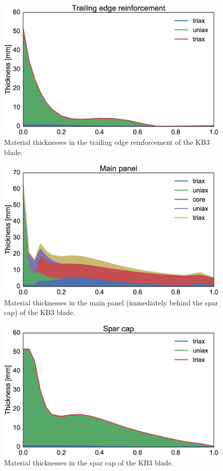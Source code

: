 \begin{figure}[!ht]
\begin{center}
	\includegraphics[width=.85\linewidth]{figures/KB3_region01.eps}
\end{center}
\caption{Material thicknesses in the trailing edge reinforcement of the KB3 blade.}
\label{fig:matstackr01}
\end{figure}

\begin{figure}[!ht]
\begin{center}
	\includegraphics[width=.85\linewidth]{figures/KB3_region02.eps}
\end{center}
\caption{Material thicknesses in the main panel (immediately behind the spar cap) of the KB3 blade.}
\label{fig:matstackr02}
\end{figure}

\begin{figure}[!ht]
\begin{center}
	\includegraphics[width=.85\linewidth]{figures/KB3_region04.eps}
\end{center}
\caption{Material thicknesses in the spar cap of the KB3 blade.}
\label{fig:matstackr04}
\end{figure}

